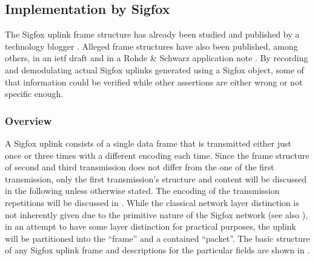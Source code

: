 \subsection{Implementation by Sigfox}
\label{sec:framestructure_realization}
The Sigfox uplink frame structure has already been studied and published by a technology blogger \cite{disk91radioprotocol}.
Alleged frame structures have also been published, among others, in an \gls{ietf} draft \cite{sigfox_ietf} and in a Rohde \& Schwarz application note \cite[Figure 1-2]{rs_appnote}.
By recording and demodulating actual Sigfox uplinks generated using a Sigfox object, some of that information could be verified while other assertions are either wrong or not specific enough.

\subsubsection{Overview}
A Sigfox uplink consists of a single data frame that is transmitted either just once or three times with a different encoding each time.
Since the frame structure of second and third transmission does not differ from the one of the first transmission, only the first transmission's structure and content will be discussed in the following unless otherwise stated.
The encoding of the transmission repetitions will be discussed in .
While the classical network layer distinction is not inherently given due to the primitive nature of the Sigfox network (see also ), in an attempt to have some layer distinction for practical purposes, the uplink will be partitioned into the ``frame'' and a contained ``packet''.
The basic structure of any Sigfox uplink frame and descriptions for the particular fields are shown in .

